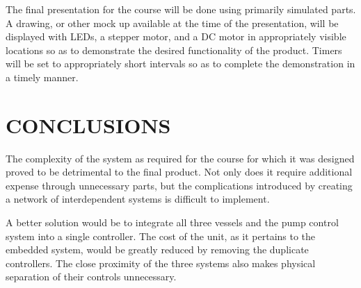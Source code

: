 \documentclass[letterpaper, 10 pt, conference]{ieeeconf}  %
\begin{document}
The final presentation for the course will be done using primarily simulated parts. A drawing, or other mock up available at the time of the presentation, will be displayed with LEDs, a stepper motor, and a DC motor in appropriately visible locations so as to demonstrate the desired functionality of the product. Timers will be set to appropriately short intervals so as to complete the demonstration in a timely manner.

\section{CONCLUSIONS}

The complexity of the system as required for the course for which it was designed proved to be detrimental to the final product. Not only does it require additional expense through unnecessary parts, but the complications introduced by creating a network of interdependent systems is difficult to implement.

A better solution would be to integrate all three vessels and the pump control system into a single controller. The cost of the unit, as it pertains to the embedded system, would be greatly reduced by removing the duplicate controllers. The close proximity of the three systems also makes physical separation of their controls unnecessary.

\addtolength{\textheight}{-12cm}   %

\end{document}
